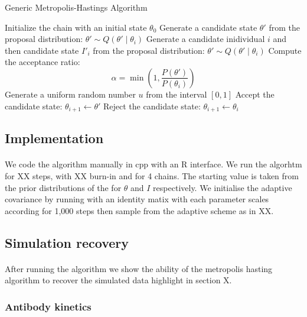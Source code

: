 \documentclass{article}
\begin{document}
\begin{algorithm}
\caption{Generic Metropolis-Hastings Algorithm}
\label{alg:metropolis_hastings_inf}
\begin{algorithmic}[1]
    \State Initialize the chain with an initial state $\theta_0$
        \State Generate a candidate state $\theta'$ from the proposal distribution: $\theta' \sim Q(\theta' \mid \theta_i)$
        \State Generate a candidate inidividual $i$ and then candidate state $I'_i$ from the proposal distribution: $\theta' \sim Q(\theta' \mid \theta_i)$
        \State Compute the acceptance ratio:
        \[
        \alpha = \min\left(1, \frac{P(\theta')}{P(\theta_i)} \right)
        \]
        \State Generate a uniform random number $u$ from the interval $[0, 1]$
            \State Accept the candidate state: $\theta_{i+1} \leftarrow \theta'$
        \Else
            \State Reject the candidate state: $\theta_{i+1} \leftarrow \theta_i$
        \EndIf
    \EndFor
\end{algorithmic}
\end{algorithm}

\subsection{Implementation }
\paragraph{} We code the algorithm manually in cpp with an R interface. We run the algorhtm for XX steps, with XX burn-in and for 4 chains. The starting value is taken from the prior distributions of the for $\theta$ and $I$ respectively. We initialise the adaptive covariance by running with an identity matix with each parameter scales according for 1,000 steps then sample from the adaptive scheme as in XX. 

\subsection{Simulation recovery }
\paragraph{} After running the algorithm we  show the ability of the metropolis hasting algorithm to recover the simulated data highlight in section X.

\subsubsection{Antibody kinetics}
\end{document}
